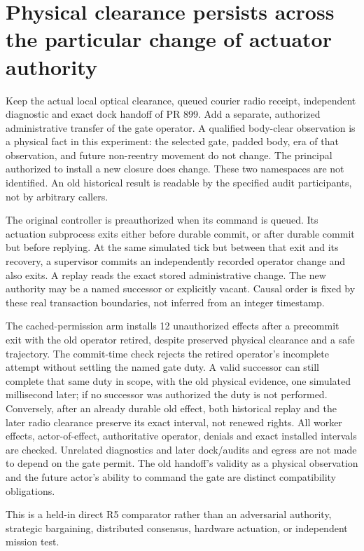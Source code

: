 \documentclass{article}
\begin{document}
\section*{Physical clearance persists across the particular change of actuator authority}
Keep the actual local optical clearance, queued courier radio receipt,
independent diagnostic and exact dock handoff of PR 899. Add a
separate, authorized administrative transfer of the gate operator.
A qualified body-clear observation is a physical fact in this
experiment: the selected gate, padded body, era of that observation,
and future non-reentry movement do not change. The principal
authorized to install a new closure does change.
These two namespaces are not identified. An old historical result is
readable by the specified audit participants, not by arbitrary callers.

The original controller is preauthorized when its command is queued.
Its actuation subprocess exits either before durable commit, or
after durable commit but before replying. At the same simulated tick
but between that exit and its recovery, a supervisor commits an
independently recorded operator change and also exits. A replay reads
the exact stored administrative change. The new authority may be a
named successor or explicitly vacant. Causal order is fixed by these
real transaction boundaries, not inferred from an integer timestamp.

The cached-permission arm installs 12 unauthorized effects after a
precommit exit with the old operator retired, despite preserved
physical clearance and a safe trajectory. The commit-time check
rejects the retired operator's incomplete attempt without settling
the named gate duty. A valid successor can still complete that
same duty in scope, with the old physical evidence, one simulated
millisecond later; if no successor was authorized the duty is not
performed. Conversely, after an already durable old effect, both
historical replay and the later radio clearance preserve its exact
interval, not renewed rights. All worker effects, actor-of-effect,
authoritative operator, denials and exact installed intervals are
checked. Unrelated diagnostics and later dock/audits and egress
are not made to depend on the gate permit. The old handoff's
validity as a physical observation and the future actor's ability to
command the gate are distinct compatibility obligations.

This is a held-in direct R5 comparator rather than an adversarial
authority, strategic bargaining, distributed consensus, hardware
actuation, or independent mission test.
\end{document}

